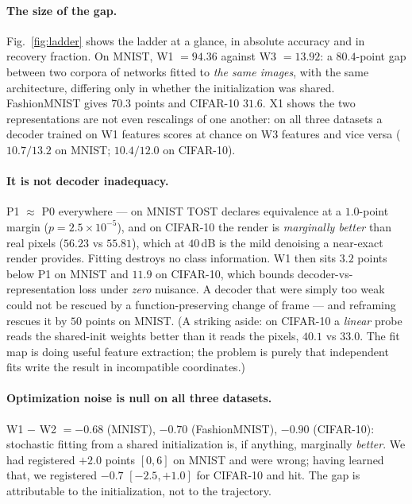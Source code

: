 \documentclass[10pt,letterpaper]{article}
\theoremstyle{definition}
\begin{document}


\paragraph{The size of the gap.} Fig.~\ref{fig:ladder} shows the ladder at a glance, in absolute
accuracy and in recovery fraction. On MNIST, W1 $=94.36$ against W3 $=13.92$: a
$\mathbf{80.4}$-point gap between two corpora of networks fitted to \emph{the same images}, with
the same architecture, differing only in whether the initialization was shared. FashionMNIST gives
$70.3$ points and CIFAR-10 $31.6$. X1 shows the two representations are not even rescalings of one
another: on all three datasets a decoder trained on W1 features scores at chance on W3 features
and vice versa ($10.7 / 13.2$ on MNIST; $10.4 / 12.0$ on CIFAR-10).

\paragraph{It is not decoder inadequacy.} P1 $\approx$ P0 everywhere --- on MNIST TOST declares
equivalence at a $1.0$-point margin ($p = 2.5\times10^{-5}$), and on CIFAR-10 the render is
\emph{marginally better} than real pixels ($56.23$ vs $55.81$), which at $40$\,dB is the mild
denoising a near-exact render provides. Fitting destroys no class information. W1 then sits
$3.2$ points below P1 on MNIST and $11.9$ on CIFAR-10, which bounds decoder-vs-representation loss
under \emph{zero} nuisance. A decoder that were simply too weak could not be rescued by a
function-preserving change of frame --- and reframing rescues it by $50$ points on MNIST.
(A striking aside: on CIFAR-10 a \emph{linear} probe reads the shared-init weights better than it
reads the pixels, $40.1$ vs $33.0$. The fit map is doing useful feature extraction; the problem is
purely that independent fits write the result in incompatible coordinates.)

\paragraph{Optimization noise is null on all three datasets.} W1 $-$ W2 $= -0.68$ (MNIST),
$-0.70$ (FashionMNIST), $-0.90$ (CIFAR-10): stochastic fitting from a shared initialization is, if
anything, marginally \emph{better}. We had registered $+2.0$ points $[0,6]$ on MNIST and were
wrong; having learned that, we registered $-0.7$ $[-2.5,+1.0]$ for CIFAR-10 and hit. The gap is
attributable to the initialization, not to the trajectory.
\end{document}
